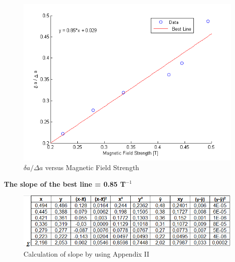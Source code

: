 \documentclass[a4paper,12pt]{article}
\begin{document}
\begin{figure}[h!]
	\centering
	\includegraphics[scale = 0.65]{"untitled"}
	\caption{$\delta a / \Delta a$ versus Magnetic Field Strength}
	\label{fig:untitled}
\end{figure}
 \textbf{	\textbullet The slope of the best line = 0.85 T$^{-1}$}
\newpage
\begin{figure}[h!]
	\centering
	\includegraphics[scale = 1.0]{"slope"}
	\caption{Calculation of slope by using Appendix II}
	\label{fig:slope}
\end{figure}
\end{document}
